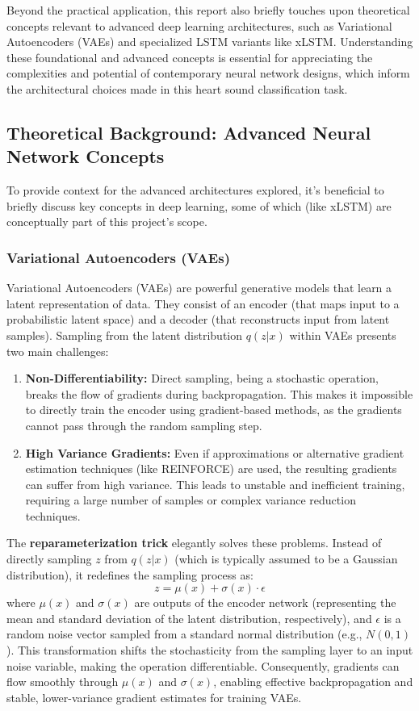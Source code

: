 \documentclass[a4paper]{article}
\begin{document}
\begin{multicols}{2}
Beyond the practical application, this report also briefly touches upon theoretical concepts relevant to advanced deep learning architectures, such as Variational Autoencoders (VAEs) and specialized LSTM variants like xLSTM. Understanding these foundational and advanced concepts is essential for appreciating the complexities and potential of contemporary neural network designs, which inform the architectural choices made in this heart sound classification task.

\subsection{Theoretical Background: Advanced Neural Network Concepts}
To provide context for the advanced architectures explored, it's beneficial to briefly discuss key concepts in deep learning, some of which (like xLSTM) are conceptually part of this project's scope.

\subsubsection{Variational Autoencoders (VAEs)}
Variational Autoencoders (VAEs) are powerful generative models that learn a latent representation of data. They consist of an encoder (that maps input to a probabilistic latent space) and a decoder (that reconstructs input from latent samples). Sampling from the latent distribution $q(z|x)$ within VAEs presents two main challenges:
\begin{enumerate}
    \item \textbf{Non-Differentiability:} Direct sampling, being a stochastic operation, breaks the flow of gradients during backpropagation. This makes it impossible to directly train the encoder using gradient-based methods, as the gradients cannot pass through the random sampling step.
    \item \textbf{High Variance Gradients:} Even if approximations or alternative gradient estimation techniques (like REINFORCE) are used, the resulting gradients can suffer from high variance. This leads to unstable and inefficient training, requiring a large number of samples or complex variance reduction techniques.
\end{enumerate}
The \textbf{reparameterization trick} elegantly solves these problems. Instead of directly sampling $z$ from $q(z|x)$ (which is typically assumed to be a Gaussian distribution), it redefines the sampling process as:
$$ z = \mu(x) + \sigma(x) \cdot \epsilon $$
where $\mu(x)$ and $\sigma(x)$ are outputs of the encoder network (representing the mean and standard deviation of the latent distribution, respectively), and $\epsilon$ is a random noise vector sampled from a standard normal distribution (e.g., $N(0, 1)$). This transformation shifts the stochasticity from the sampling layer to an input noise variable, making the operation differentiable. Consequently, gradients can flow smoothly through $\mu(x)$ and $\sigma(x)$, enabling effective backpropagation and stable, lower-variance gradient estimates for training VAEs.


\end{multicols}
\end{document}
